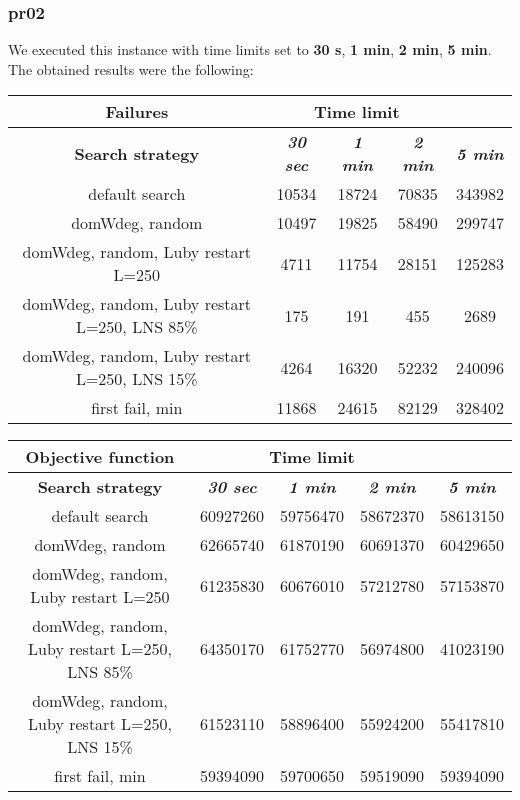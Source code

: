 \subsubsection{pr02}
We executed this instance with time limits set to \textbf{30 s}, \textbf{1 min}, \textbf{2 min}, \textbf{5 min}.\\
The obtained results were the following:
{
\renewcommand{\arraystretch}{2}
\begin{longtable}[h]{| c | c | c | c | c |}
    \hline
    \textbf{Failures} & \multicolumn{3}{c}{Time limit} & \\
    \hline
    \textbf{Search strategy} & \textbf{\textit{30 sec}} & \textbf{\textit{1 min}} & \textbf{\textit{2 min}} & \textbf{\textit{5 min}} \\
    \hline
    \endhead
    default search                                & 10534 & 18724 & 70835 & 343982 \\
    \hline
    domWdeg, random                               & 10497 & 19825 & 58490 & 299747 \\
    \hline
    domWdeg, random, Luby restart L=250           &  4711 & 11754 & 28151 & 125283 \\
    \hline
    domWdeg, random, Luby restart L=250, LNS 85\% &   175 &   191 &   455 &   2689 \\
    \hline
    domWdeg, random, Luby restart L=250, LNS 15\% &  4264 & 16320 & 52232 & 240096 \\
    \hline
    first fail, min                               & 11868 & 24615 & 82129 & 328402 \\
    \hline
\end{longtable}
}

{
\renewcommand{\arraystretch}{2}
\begin{longtable}[h]{| c | c | c | c | c |}
    \hline
    \textbf{Objective function} & \multicolumn{3}{c}{Time limit} & \\
    \hline
    \textbf{Search strategy} & \textbf{\textit{30 sec}} & \textbf{\textit{1 min}} & \textbf{\textit{2 min}} & \textbf{\textit{5 min}} \\
    \hline
    \endhead
    default search                                & 60927260 & 59756470 & 58672370 & 58613150 \\
    \hline
    domWdeg, random                               & 62665740 & 61870190 & 60691370 & 60429650 \\
    \hline
    domWdeg, random, Luby restart L=250           & 61235830 & 60676010 & 57212780 & 57153870 \\
    \hline
    domWdeg, random, Luby restart L=250, LNS 85\% & 64350170 & 61752770 & 56974800 & 41023190 \\
    \hline
    domWdeg, random, Luby restart L=250, LNS 15\% & 61523110 & 58896400 & 55924200 & 55417810 \\
    \hline
    first fail, min                               & 59394090 & 59700650 & 59519090 & 59394090 \\
    \hline
\end{longtable}
}